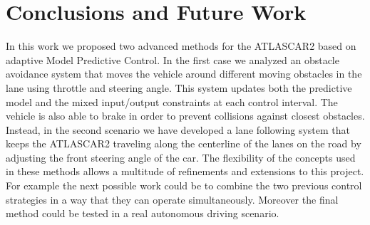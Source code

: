 \documentclass[conference, 11pt]{IEEEtran}
\begin{document}
\section{Conclusions and Future Work}
In this work we proposed two advanced methods for the ATLASCAR2 based on adaptive Model Predictive Control. In the first case we analyzed an obstacle avoidance system that moves the vehicle around different moving obstacles in the lane using throttle and steering angle. This system updates both the predictive model and the mixed input/output constraints at each control interval. The vehicle is also able to brake in order to prevent collisions against closest obstacles. Instead, in the second scenario  we have developed a lane following system that keeps the ATLASCAR2 traveling along the centerline of the lanes on the road by adjusting the front steering angle of the car. The flexibility of the concepts used in these methods allows a multitude of refinements and extensions to this project. For example the next possible work could be to combine the two previous control strategies in a way that they can operate simultaneously. Moreover the final method could be tested in a real autonomous driving scenario.
\end{document}
